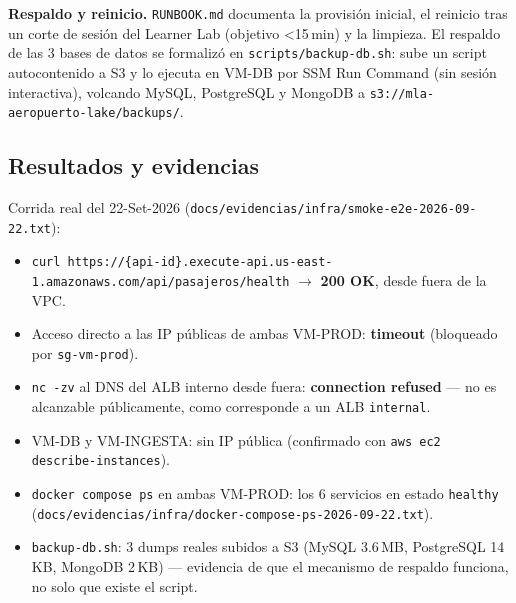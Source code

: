 \textbf{Respaldo y reinicio.} \texttt{RUNBOOK.md} documenta la provisión inicial, el reinicio tras un
corte de sesión del Learner Lab (objetivo \textless{}15\,min) y la limpieza. El respaldo de las 3 bases
de datos se formalizó en \texttt{scripts/backup-db.sh}: sube un script autocontenido a S3 y lo ejecuta
en VM-DB por SSM Run Command (sin sesión interactiva), volcando MySQL, PostgreSQL y MongoDB a
\texttt{s3://mla-aeropuerto-lake/backups/}.

\subsection{Resultados y evidencias}

Corrida real del 22-Set-2026 (\texttt{docs/evidencias/infra/smoke-e2e-2026-09-22.txt}):

\begin{itemize}
\item \texttt{curl https://\{api-id\}.execute-api.us-east-1.amazonaws.com/api/pasajeros/health} $\to$
  \textbf{200 OK}, desde fuera de la VPC.
\item Acceso directo a las IP públicas de ambas VM-PROD: \textbf{timeout} (bloqueado por
  \texttt{sg-vm-prod}).
\item \texttt{nc -zv} al DNS del ALB interno desde fuera: \textbf{connection refused} — no es
  alcanzable públicamente, como corresponde a un ALB \texttt{internal}.
\item VM-DB y VM-INGESTA: sin IP pública (confirmado con \texttt{aws ec2 describe-instances}).
\item \texttt{docker compose ps} en ambas VM-PROD: los 6 servicios en estado \texttt{healthy}
  (\texttt{docs/evidencias/infra/docker-compose-ps-2026-09-22.txt}).
\item \texttt{backup-db.sh}: 3 dumps reales subidos a S3 (MySQL 3.6\,MB, PostgreSQL 14\,KB, MongoDB
  2\,KB) — evidencia de que el mecanismo de respaldo funciona, no solo que existe el script.
\end{itemize}

